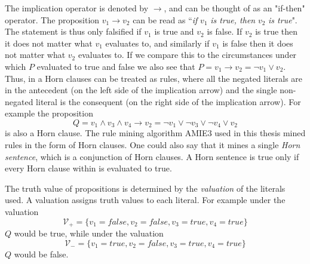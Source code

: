 The implication operator is denoted by $\rightarrow$, and can be thought of as an "if-then" operator. The proposition $v_1 \rightarrow v_2$ can be read as ``\textit{if} $v_1$\textit{ is true, then }$v_2$ \textit{is true}". The statement is thus only falsified if $v_1$ is true and $v_2$ is false. If $v_2$ is true then it does not matter what $v_1$ evaluates to, and similarly if $v_1$ is false then it does not matter what $v_2$ evaluates to. If we compare this to the circumstances under which $P$ evaluated to true and false we also see that $P = v_1 \rightarrow v_2 = \neg v_1 \vee v_2$. 
Thus, in a Horn clauses can be treated as rules, where all the negated literals are in the antecedent (on the left side of the implication arrow) and the single non-negated literal is the consequent (on the right side of the implication arrow). For example the proposition \[Q = v_1 \wedge v_3 \wedge v_4\rightarrow v_2 = \neg v_1 \vee \neg v_3 \vee \neg v_4\vee v_2\] is also a Horn clause. The rule mining algorithm AMIE3 used in this thesis mined rules in the form of Horn clauses. One could also say that it mines a single \textit{Horn sentence}, which is a conjunction of Horn clauses. A Horn sentence is true only if every Horn clause within is evaluated to true.

The truth value of propositions is determined by the \textit{valuation} of the literals used. A valuation assigns truth values to each literal. For example under the valuation \[\mathcal{V_{+}}=\{v_1 = false, v_2 = false, v_3 = true, v_4 = true\}\] $Q$ would be true, while under the valuation \[\mathcal{V_{-}}=\{v_1 = true, v_2 = false, v_3 = true, v_4 = true\}\] $Q$ would be false.